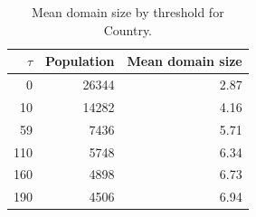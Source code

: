 \begin{table}[htbp]
\centering
\small
\begin{tabular}{r r r}
\hline
$\tau$ & Population & Mean domain size \\
\hline
0 & 26344 & 2.87 \\
10 & 14282 & 4.16 \\
59 & 7436 & 5.71 \\
110 & 5748 & 6.34 \\
160 & 4898 & 6.73 \\
190 & 4506 & 6.94 \\
\hline
\end{tabular}
\caption{Mean domain size by threshold for Country.}
\label{tab:mean-size-Country}
\end{table}
